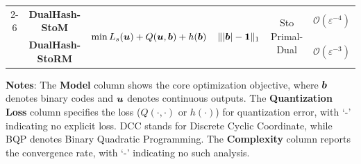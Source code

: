 \begin{table}[t]
{\begin{tabular}{cccccc}
    \cmidrule(lr){2-6}
   & \textbf{DualHash-StoM} & \multirow{2}{*}{\small $ \min L_s(\bm{u}) + Q(\bm{u},\bm{b}) + h(\bm{b})$} & \multirow{2}{*}{$\| | \bm{b}| - \mathbf{1}\|_1$} & \multirow{2}{*}{Sto Primal-Dual} & $\mathcal{O}(\varepsilon^{-4})$ \\
    & \textbf{DualHash-StoRM} & & & & $\mathcal{O}(\varepsilon^{-3})$ \\
    \bottomrule
    \end{tabular}
    }
    \parbox{\linewidth}{\scriptsize
    \textbf{Notes}: 
    The \textbf{Model} column shows the core optimization objective, where \(\bm{b}\) denotes binary codes and \(\bm{u}\) denotes continuous outputs. The \textbf{Quantization Loss} column specifies the loss (\(Q(\cdot, \cdot)\) or \(h(\cdot)\)) for quantization error, with `-' indicating no explicit loss. 
    DCC stands for Discrete Cyclic Coordinate, while BQP denotes Binary Quadratic Programming. The \textbf{Complexity} column reports the convergence rate, with `-' indicating no such analysis.
    }
     \vspace{-2ex}
\end{table}
